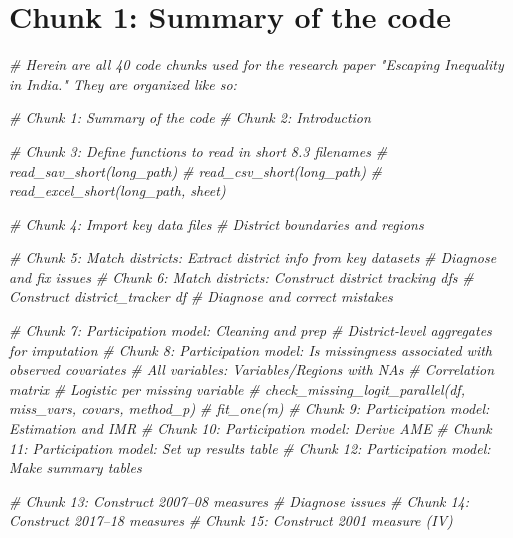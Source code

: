 \documentclass[
]{article}
\author{}
\date{\vspace{-2.5em}}
\newenvironment{Shaded}{\begin{snugshade}}{\end{snugshade}}
\newcommand{\CommentTok}[1]{\textcolor[rgb]{0.56,0.35,0.01}{\textit{#1}}}
\begin{document}
\section*{Chunk 1: Summary of the code}\label{chunk-1-summary-of-the-code}

\begin{Shaded}
\begin{Highlighting}[]
\CommentTok{\# Herein are all 40 code chunks used for the research paper "Escaping Inequality in India." They are organized like so:}

\CommentTok{\# Chunk 1: Summary of the code}
\CommentTok{\# Chunk 2: Introduction}

\CommentTok{\# Chunk 3: Define functions to read in short 8.3 filenames}
  \CommentTok{\# read\_sav\_short(long\_path)}
  \CommentTok{\# read\_csv\_short(long\_path)}
  \CommentTok{\# read\_excel\_short(long\_path, sheet)}

\CommentTok{\# Chunk 4: Import key data files}
  \CommentTok{\# District boundaries and regions}

\CommentTok{\# Chunk 5: Match districts: Extract district info from key datasets}
  \CommentTok{\# Diagnose and fix issues}
\CommentTok{\# Chunk 6: Match districts: Construct district tracking dfs}
  \CommentTok{\# Construct district\_tracker df}
  \CommentTok{\# Diagnose and correct mistakes}

\CommentTok{\# Chunk 7: Participation model: Cleaning and prep}
  \CommentTok{\# District{-}level aggregates for imputation}
\CommentTok{\# Chunk 8: Participation model: Is missingness associated with observed covariates}
  \CommentTok{\# All variables: Variables/Regions with NAs}
  \CommentTok{\# Correlation matrix}
  \CommentTok{\# Logistic per missing variable}
    \CommentTok{\# check\_missing\_logit\_parallel(df, miss\_vars, covars, method\_p)}
    \CommentTok{\# fit\_one(m)}
\CommentTok{\# Chunk 9: Participation model: Estimation and IMR}
\CommentTok{\# Chunk 10: Participation model: Derive AME}
\CommentTok{\# Chunk 11: Participation model: Set up results table}
\CommentTok{\# Chunk 12: Participation model: Make summary tables}

\CommentTok{\# Chunk 13: Construct 2007–08 measures}
  \CommentTok{\# Diagnose issues}
\CommentTok{\# Chunk 14: Construct 2017–18 measures}
\CommentTok{\# Chunk 15: Construct 2001 measure (IV)}


\end{Highlighting}
\end{Shaded}
\end{document}
